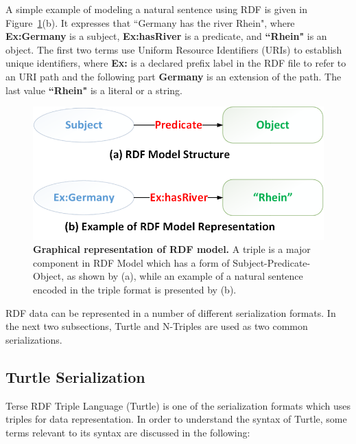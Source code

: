 A simple example of modeling a natural sentence using RDF is given in Figure~\ref{Fig:rdfModel}(b). 
It expresses that ``Germany has the river Rhein", where \textbf{Ex:Germany} is a subject, \textbf{Ex:hasRiver} is a predicate, and \textbf{``Rhein"} is an object. 
The first two terms use Uniform Resource Identifiers (URIs) to establish unique identifiers, where \textbf{Ex:} is a declared prefix label in the RDF file to refer to an URI path and the following part \textbf{Germany} is an extension of the path. 
The last value \textbf{``Rhein"} is a literal or a string. %

\begin{figure}[ht]
	\begin{center}
		\includegraphics[scale=0.4,angle=0]{images/RDF-Model}
		\setlength\belowcaptionskip{-5mm}
		\caption{\textbf{Graphical representation of RDF model.} A triple is a major component in RDF Model which has a form of Subject-Predicate-Object, as shown by (a), while an example of a natural sentence encoded in the triple format is presented by (b).}
		\label{Fig:rdfModel}
	\end{center}
\end{figure}
RDF data can be represented in a number of different serialization formats.
In the next two subsections, Turtle and N-Triples are used as two common serializations. 

\subsection{Turtle Serialization}
Terse RDF Triple Language (Turtle) \cite{W3C:Turtle:Online} is one of the serialization formats which uses triples for data representation. 
In order to understand the syntax of Turtle, some terms  relevant to its syntax are discussed in the following:

